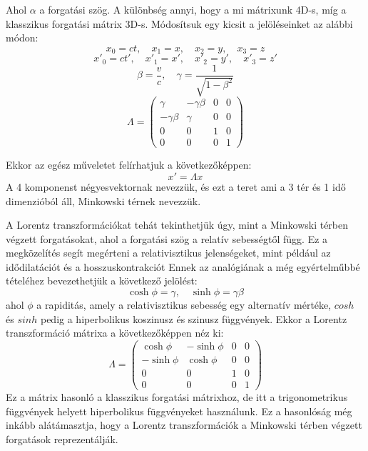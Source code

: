 \documentclass[a4paper,12pt]{article}
\begin{document}
Ahol $\alpha$ a forgatási szög. A különbség annyi, hogy a mi mátrixunk 4D-s, míg a klasszikus forgatási mátrix 3D-s.
Módosítsuk egy kicsit a jelöléseinket az alábbi módon:
\begin{equation}
    x_0 = ct, \quad x_1 = x, \quad x_2 = y, \quad x_3 = z
\end{equation}
\begin{equation}
    x'_0 = ct', \quad x'_1 = x', \quad x'_2 = y', \quad x'_3 = z'
\end{equation}
\begin{equation}
    \beta = \frac{v}{c}, \quad \gamma = \frac{1}{\sqrt{1 - \beta^2}}
\end{equation}
\begin{equation}
    \Lambda =
    \begin{pmatrix}
        \gamma & -\gamma \beta & 0 & 0 \\
        -\gamma \beta & \gamma & 0 & 0 \\
        0 & 0 & 1 & 0 \\
        0 & 0 & 0 & 1
    \end{pmatrix}
\end{equation}

Ekkor az egész műveletet felírhatjuk a következőképpen:
\begin{equation}
    x' = \Lambda x
\end{equation}
A 4 komponenst négyesvektornak nevezzük, és ezt a teret ami a 3 tér és 1 idő dimenzióból áll, Minkowski térnek nevezzük.

A Lorentz transzformációkat tehát tekinthetjük úgy, mint a Minkowski térben végzett forgatásokat, ahol a forgatási szög a relatív sebességtől függ. Ez a megközelítés segít megérteni a relativisztikus jelenségeket, mint például az idődilatációt és a hosszuskontrakciót
Ennek az analógiának a még egyértelműbbé tételéhez bevezethetjük a következő jelölést:
\begin{equation}
    \cosh \phi = \gamma, \quad \sinh \phi = \gamma \beta
\end{equation}
ahol $\phi$ a rapiditás, amely a relativisztikus sebesség egy alternatív mértéke, $cosh$ és $sinh$ pedig a hiperbolikus koszinusz és szinusz függvények. Ekkor a Lorentz transzformáció mátrixa a következőképpen néz ki:
\begin{equation}
    \Lambda =
    \begin{pmatrix}
        \cosh \phi & -\sinh \phi & 0 & 0 \\
        -\sinh \phi & \cosh \phi & 0 & 0 \\
        0 & 0 & 1 & 0 \\
        0 & 0 & 0 & 1
    \end{pmatrix}
\end{equation}
Ez a mátrix hasonló a klasszikus forgatási mátrixhoz, de itt a trigonometrikus függvények helyett hiperbolikus függvényeket használunk. Ez a hasonlóság még inkább alátámasztja,
hogy a Lorentz transzformációk a Minkowski térben végzett forgatások reprezentálják.
\end{document}

